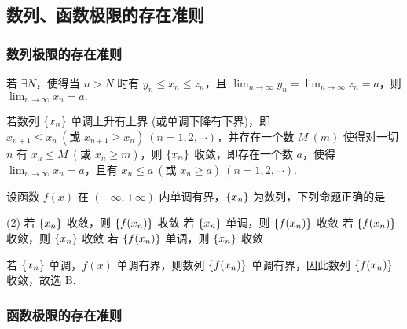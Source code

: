 \subsection{数列、函数极限的存在准则}

\subsubsection{数列极限的存在准则}

\begin{theorem}[夹逼准则]
    \label{pinchGuidelines}
    若 $\exists N$，使得当 $n>N$ 时有 $y_n\leqslant x_n\leqslant z_n$，且 $\displaystyle\lim_{n\to\infty}y_n=\lim_{n\to\infty}z_n=a$，则 $\displaystyle\lim_{n\to\infty}x_n=a.$
\end{theorem}

\begin{theorem}[数列的单调有界准则]
    若数列 $\qty{x_n}$ 单调上升有上界 (或单调下降有下界)，即 $x_{n+1}\leqslant x_n~(\text{或 }x_{n+1}\geqslant x_n)~(n=1,2,\cdots)$，并存在一个数 $M~ (m)$ 使得对一切 $n$ 有 $x_n\leqslant M~(\text{或 }x_n\geqslant m)$，则 $\qty{x_n}$ 收敛，即存在一个数 $a$，使得 $\displaystyle\lim_{n\to\infty}x_n=a$，且有 $x_n\leqslant a~(\text{或 }x_n\geqslant a)~(n=1,2,\cdots)$.
\end{theorem}

\begin{example}[2008 数一]
    设函数 $f(x)$ 在 $(-\infty,+\infty)$ 内单调有界，$\qty{x_n}$ 为数列，下列命题正确的是 
    \begin{tasks}(2)
        \task 若 $\qty{x_n}$ 收敛，则 $\qty{f(x_n)}$ 收敛
        \task 若 $\qty{x_n}$ 单调，则 $\qty{f(x_n)}$ 收敛
        \task 若 $\qty{f(x_n)}$ 收敛，则 $\qty{x_n}$ 收敛
        \task 若 $\qty{f(x_n)}$ 单调，则 $\qty{x_n}$ 收敛
    \end{tasks}
\end{example}
\begin{solution}
    若 $\qty{x_n}$ 单调，$f(x)$ 单调有界，则数列 $\qty{f(x_n)}$ 单调有界，因此数列 $\qty{f(x_n)}$ 收敛，故选 B.
\end{solution}

\subsubsection{函数极限的存在准则}

